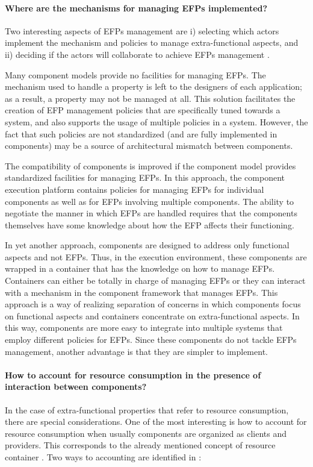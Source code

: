 \paragraph{Where are the mechanisms for managing EFPs implemented?}
Two interesting aspects of EFPs management are i) selecting which actors implement the mechanism and policies to manage extra-functional aspects, and ii) deciding if the actors will collaborate to achieve EFPs management \cite{Crnkovic2011}.

Many component models provide no facilities for managing EFPs.
The mechanism used to handle a property is left to the designers of each application; as a result, a
property may not be managed at all.
This solution facilitates the creation of EFP management policies that are specifically tuned towards a system, and also supports the usage of multiple policies in a system.
However, the fact that such policies are not
standardized (and are fully implemented in components) may be a source of architectural mismatch between
components.

The compatibility of components is improved if the
component model provides standardized facilities for managing EFPs.
In this approach, the component execution platform contains
policies for managing EFPs for individual components as well as for EFPs involving multiple components.
The ability to negotiate the manner in which EFPs are handled requires that the
components themselves have some knowledge about how the EFP affects their functioning.

In yet another approach, components are designed to address only functional aspects and not EFPs.
Thus, in the execution environment, these components
are wrapped in a container that has the knowledge on how to manage EFPs.
Containers can either be totally in charge of managing EFPs or
they can interact with a mechanism in the component framework that manages EFPs.
This approach is a way of realizing separation of
concerns in which components focus on functional aspects
and containers concentrate on extra-functional aspects.
In this way, components are more easy to integrate into multiple systems that employ different policies for EFPs.
Since these components do not tackle EFPs management, another advantage is that they are simpler to implement.

\paragraph{How to account for resource consumption in the presence of interaction between components?}
In the case of extra-functional properties that refer to resource consumption, there are special considerations.
One of the most interesting is how to account for resource consumption when usually components are organized as clients and providers.
This corresponds to the already mentioned concept of resource container \cite{Banga:1999:RCN:296806.296810}.
Two ways to accounting are identified in \cite{Miettinen2008,Maurel:2012:AME:2304736.2304763}:

